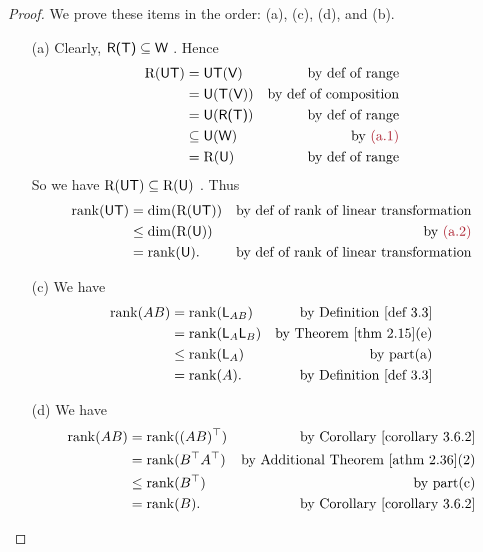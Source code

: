 \begin{proof}
We prove these items in the order: (a), (c), (d), and (b).
\begin{enumerate}
\item[(a)] Clearly, \(\textsf{R(T)} \subseteq \textsf{W}\) .
Hence
\begin{align*}
    \RANGE(\U\T) & = \U\T(\V) & \text{by def of range} \\
                 & = \U(\T(\V)) & \text{by def of composition} \\
                 & = \U(\RANGET) & \text{by def of range} \\
                 & \subseteq \U(\W) & \text{by \MAROON{(a.1)}} \\
                 & = \RANGE(\U) & \text{by def of range}
\end{align*}
So we have \(\mathrm{R}(\textsf{U}\textsf{T}) \subseteq \mathrm{R}(\textsf{U})\) .
Thus
\begin{align*}
    \rank(\U\T) & = \dim(\RANGE(\U\T)) & \text{by def of rank of \LTRAN{}} \\
                & \le \dim(\RANGE(\U)) & \text{by \MAROON{(a.2)}} \\
                & = \rank(\U). & \text{by def of rank of \LTRAN{}}
\end{align*}

\item[(c)] We have
\begin{align*}
    \rank(AB) & = \rank(\LMTRAN_{AB}) & \text{by \DEF{3.3}} \\
              & = \rank(\LMTRAN_A \LMTRAN_B) & \text{by \THM{2.15}(e)} \\
              & \le \rank(\LMTRAN_A) & \text{by part(a)} \\
              & = \rank(A). & \text{by \DEF{3.3}}
\end{align*}

\item[(d)] We have
\begin{align*}
    \rank(AB) & = \rank((AB)^\top) & \text{by \CORO{3.6.2}} \\
              & = \rank(B^\top A^\top) & \text{by \ATHM{2.36}(2)} \\
              & \le \rank(B^\top) & \text{by part(c)} \\
              & = \rank(B). & \text{by \CORO{3.6.2}}
\end{align*}


\end{enumerate}
\end{proof}
